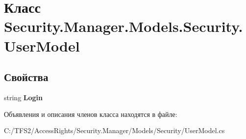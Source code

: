 \hypertarget{class_security_1_1_manager_1_1_models_1_1_security_1_1_user_model}{}\section{Класс Security.\+Manager.\+Models.\+Security.\+User\+Model}
\label{class_security_1_1_manager_1_1_models_1_1_security_1_1_user_model}
\subsection*{Свойства}
\begin{DoxyCompactItemize}
\item 
\mbox{\label{class_security_1_1_manager_1_1_models_1_1_security_1_1_user_model_afabcb36ff8846172f24b4c48c2de114d}} 
string {\bfseries Login}
\end{DoxyCompactItemize}


Объявления и описания членов класса находятся в файле\+:\begin{DoxyCompactItemize}
\item 
C\+:/\+T\+F\+S2/\+Access\+Rights/\+Security.\+Manager/\+Models/\+Security/User\+Model.\+cs\end{DoxyCompactItemize}
